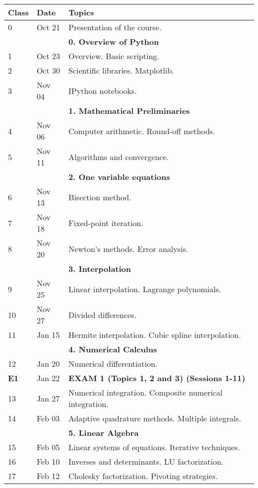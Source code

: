 \documentclass[a4,useAMS,usenatbib,usegraphicx,12pt]{article}
\begin{document}
\begin{table}[!ht]
\begin{small}
\begin{flushleft}
\begin{center}
  \begin{tabular}{l  l  l} \hline\hline
	\centering\textbf{Class} & \textbf{Date} & \textbf{Topics} \\ \hline
	0 & Oct 21& Presentation of the course. \\
	& & \textbf{0. Overview of Python} \\
	1 & Oct 23& Overview. Basic scripting. \\
	2 & Oct 30& Scientific libraries. Matplotlib. \\
	3 & Nov 04& IPython notebooks. \\
	& & \textbf{1. Mathematical Preliminaries} \\
	4 & Nov 06& Computer arithmetic. Round-off methods. \\
	5 & Nov 11& Algorithms and convergence. \\
	& & \textbf{2. One variable equations} \\
	6 & Nov 13& Bisection method. \\
	7 & Nov 18& Fixed-point iteration. \\
	8 & Nov 20& Newton's methods. Error analysis. \\
	& & \textbf{3. Interpolation} \\
	9 & Nov 25& Linear interpolation. Lagrange polynomials. \\
	10 & Nov 27& Divided differences. \\
	11 & Jan 15& Hermite interpolation. Cubic spline interpolation. \\
	& & \textbf{4. Numerical Calculus} \\
	12 & Jan 20& Numerical differentiation. \\
	\textbf{E1} & Jan 22& \textbf{EXAM 1 (Topics 1, 2 and 3) (Sessions 1-11)} \\
	13 & Jan 27& Numerical integration. Composite numerical integration. \\
	14 & Feb 03& Adaptive quadrature methods. Multiple integrals. \\
	& & \textbf{5. Linear Algebra} \\
	15 & Feb 05& Linear systems of equations. Iterative techniques. \\
	16 & Feb 10& Inverses and determinants. LU factorization. \\
	17 & Feb 12& Cholesky factorization. Pivoting strategies. \\

\end{tabular}
\end{center}
\end{flushleft}
\end{small}
\end{table}
\end{document}
